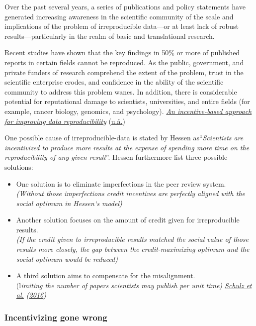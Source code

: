 \documentclass[
  12pt,
  norsk,
]{article}
\begin{document}
Over the past several years, a series of publications and policy
statements have generated increasing awareness in the scientific
community of the scale and implications of the problem of irreproducible
data---or at least lack of robust results---particularly in the realm of
basic and translational research.

Recent studies have shown that the key findings in 50\% or more of
published reports in certain fields cannot be reproduced. As the public,
government, and private funders of research comprehend the extent of the
problem, trust in the scientific enterprise erodes, and confidence in
the ability of the scientific community to address this problem wanes.
In addition, there is considerable potential for reputational damage to
scientists, universities, and entire fields (for example, cancer
biology, genomics, and psychology).
\protect\hyperlink{ref-Science.org}{\emph{An incentive-based approach
for improving data reproducibility}}
(\protect\hyperlink{ref-Science.org}{u.å.})

One possible cause of irreproducible-data is stated by Hessen
as``\emph{Scientists are incentivized to produce more results at the
expense of spending more time on the reproducibility of any given
result}''. Hessen furthermore list three possible solutions:

\begin{itemize}
\item
  One solution is to eliminate imperfections in the peer review
  system.\\
  \emph{(Without those imperfections credit incentives are perfectly
  aligned with the social optimum in Hessen`s model)}
\item
  Another solution focuses on the amount of credit given for
  irreproducible results.\\
  \emph{(If the credit given to irreproducible results matched the
  social value of those results more closely, the gap between the
  credit-maximizing optimum and the social optimum would be reduced)}
\item
  A third solution aims to compensate for the misalignment.\\
  (l\emph{imiting the number of papers scientists may publish per unit
  time) \protect\hyperlink{ref-schulz2016}{Schulz et al.}
  (\protect\hyperlink{ref-schulz2016}{2016})}
\end{itemize}

\hypertarget{incentivizing-gone-wrong}{%
\subsubsection{Incentivizing gone
wrong}\label{incentivizing-gone-wrong}}
\end{document}
